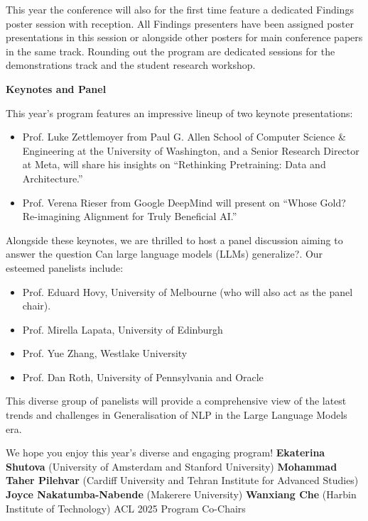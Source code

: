 This year the conference will also for the first time feature a dedicated Findings poster session with reception. All Findings presenters have been assigned poster presentations in this session or alongside other posters for main conference papers in the same track.
Rounding out the program are dedicated sessions for the demonstrations track and the student research workshop.


\textbf{Keynotes and Panel}

This year’s program features an impressive lineup of two keynote presentations:
\begin{itemize}
\item Prof. Luke Zettlemoyer from Paul G. Allen School of Computer Science & Engineering at the University of Washington, and a Senior Research Director at Meta, will share his insights on “Rethinking Pretraining: Data and Architecture.”
\item Prof. Verena Rieser from Google DeepMind will present on “Whose Gold? Re-imagining Alignment for Truly Beneficial AI.”
\end{itemize}

Alongside these keynotes, we are thrilled to host a panel discussion aiming to answer the question Can large language models (LLMs) generalize?. Our esteemed panelists include:
\begin{itemize}
\item Prof. Eduard Hovy, University of Melbourne (who will also act as the panel chair).
\item Prof. Mirella Lapata, University of Edinburgh
\item Prof. Yue Zhang, Westlake University
\item Prof. Dan Roth, University of Pennsylvania and Oracle
\end{itemize}

This diverse group of panelists will provide a comprehensive view of the latest trends and challenges in Generalisation of NLP in the Large Language Models era. 

We hope you enjoy this year’s diverse and engaging program!
\textbf{Ekaterina Shutova} (University of Amsterdam and Stanford University)
\textbf{Mohammad Taher Pilehvar} (Cardiff University and Tehran Institute for Advanced Studies)
\textbf{Joyce Nakatumba-Nabende} (Makerere University)
\textbf{Wanxiang Che} (Harbin Institute of Technology)
ACL 2025 Program Co-Chairs
